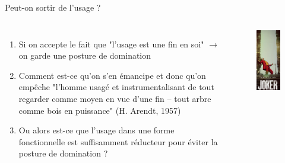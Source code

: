 \documentclass[newPxFont]{beamer}
\begin{document}
\begin{frame}[c]{Peut-on sortir de l'usage ? }
  \vspace{-1cm}
  \begin{columns}[onlytextwidth,T]
    \column{\dimexpr\linewidth-30mm-5mm}
    \begin{enumerate}
        \item Si on accepte le fait que "l'usage est une fin en soi" $\rightarrow$ on garde une posture de domination
        \item Comment est-ce qu'on s'en émancipe et donc qu'on empêche "l'homme usagé et instrumentalisant de tout regarder comme moyen en vue d'une fin – tout arbre comme bois en puissance" (H. Arendt, 1957)
        \item Ou alors est-ce que l'usage dans une forme fonctionnelle est suffisamment réducteur pour éviter la posture de domination ?
    \end{enumerate}

    \column{30mm}
    \begin{figure}
      \includegraphics[width=3.9cm]{img/joker.jpg}
    \end{figure}
  \end{columns}
\end{frame}
\end{document}

